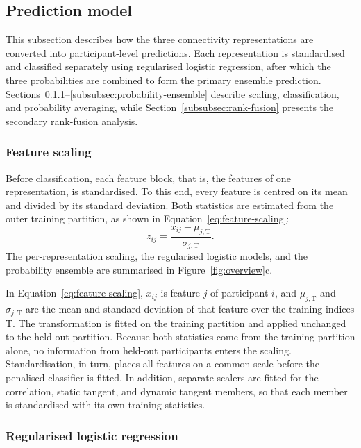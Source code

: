 \subsection{Prediction model}
\label{subsec:prediction-model}

This subsection describes how the three connectivity representations are converted into
participant-level predictions. Each representation is standardised and classified
separately using regularised logistic regression, after which the three probabilities are
combined to form the primary ensemble prediction. Sections~\ref{subsubsec:feature-scaling}--\ref{subsubsec:probability-ensemble}
describe scaling, classification, and probability averaging, while
Section~\ref{subsubsec:rank-fusion} presents the secondary rank-fusion analysis.

\subsubsection{Feature scaling}
\label{subsubsec:feature-scaling}

Before classification, each feature block, that is, the features of one representation, is
standardised. To this end, every feature is
centred on its mean and divided by its standard deviation. Both statistics are estimated
from the outer training partition, as shown in Equation~\eqref{eq:feature-scaling}:
\begin{equation}
z_{ij}
=
\frac{x_{ij}-\mu_{j,\mathrm{T}}}
{\sigma_{j,\mathrm{T}}}.
\label{eq:feature-scaling}
\end{equation}
The per-representation scaling, the regularised logistic models, and the probability
ensemble are summarised in Figure~\ref{fig:overview}c.

In Equation~\eqref{eq:feature-scaling}, $x_{ij}$ is feature $j$ of participant $i$, and
$\mu_{j,\mathrm{T}}$ and $\sigma_{j,\mathrm{T}}$ are the mean and standard deviation of
that feature over the training indices $\mathrm{T}$. The transformation is fitted on the
training partition and applied unchanged to the held-out partition. Because both
statistics come from the training partition alone, no information from held-out
participants enters the scaling. Standardisation, in turn, places all features on a common
scale before the penalised classifier is fitted. In addition, separate scalers are fitted
for the correlation, static tangent, and dynamic tangent members, so that each member is
standardised with its own training statistics.

\subsubsection{Regularised logistic regression}
\label{subsubsec:logistic-regression}

